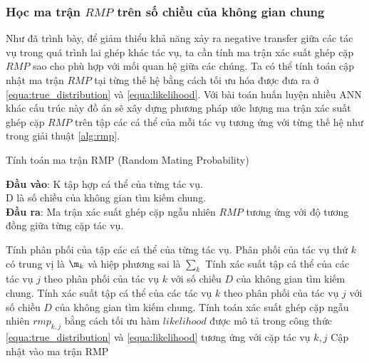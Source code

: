 \subsubsection{Học ma trận $RMP$ trên số chiều của không gian chung}
Như đã trình bày, để giảm thiểu khả năng xảy ra negative transfer giữa các tác vụ trong quá trình lai ghép khác tác vụ, ta cần tính ma trận xác suất ghép cặp $RMP$ sao cho phù hợp với mối quan hệ giữa các chúng. Ta có thể tính toán cập nhật ma trận $RMP$ tại từng thế hệ bằng cách tối ưu hóa được đưa ra ở \ref{equa:true_distribution} và \ref{equa:likelihood}. Với bài toán huấn luyện nhiều ANN khác cấu trúc này đồ án sẽ xây dựng phương pháp ước lượng ma trận xác suất ghép cặp $RMP$ trên tập các cá thể của mỗi tác vụ tương ứng với từng thế hệ như trong giải thuật \ref{alg:rmp}.

\begin{algorithm}[h!]
    \caption{Tính toán ma trận RMP (Random Mating Probability)}
    \textbf{Đầu vào}: K tập hợp cá thể của từng tác vụ.\\
    D là số chiều của không gian tìm kiếm chung.\\
    \textbf{Đầu ra}: Ma trận xác suất ghép cặp ngẫu nhiên $RMP$ tương ứng với độ tương đồng giữa từng cặp tác vụ. 
    \begin{algorithmic}[1]
        \State Tính phân phối của tập các cá thể của từng tác vụ. Phân phối của tác vụ thứ $k$ có trung vị là $\m_k$ và hiệp phương sai là $\sum_k$
                \State Tính xác suất tập cá thể của các tác vụ $j$ theo phân phối của tác vụ $k$ với số chiều $D$ của không gian tìm kiếm chung.
                \State Tính xác suất tập cá thể của các tác vụ $k$ theo phân phối của tác vụ $j$ với số chiều $D$ của không gian tìm kiếm chung.
                \State Tính toán xác suất ghép cặp ngẫu nhiên $rmp_{k,j}$ bằng cách tối ưu hàm $likelihood$ được mô tả trong công thức \ref{equa:true_distribution} và \ref{equa:likelihood} tương ứng với cặp tác vụ $k,j$
                \State Cập nhật vào ma trận RMP
            \EndFor
        \EndFor
    \end{algorithmic}
    \label{alg:rmp}
\end{algorithm}


